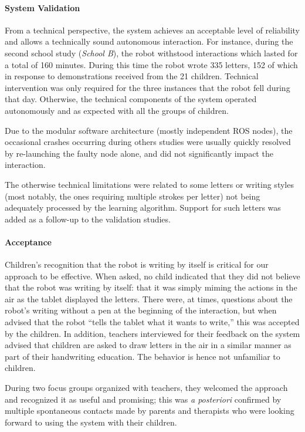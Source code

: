 \documentclass{article}
\begin{document}
\paragraph{System Validation}

From a technical perspective, the system achieves an acceptable level of
reliability and allows a technically sound autonomous interaction. For instance,
during the second school study (\textit{School B}), the robot withstood
interactions which lasted for a total of 160 minutes.  During this time the
robot wrote 335 letters, 152 of which in response to demonstrations received
from the 21 children. Technical intervention was only required for the three
instances that the robot fell during that day.  Otherwise, the technical
components of the system operated autonomously and as expected with all the
groups of children.

Due to the modular software architecture (mostly independent ROS nodes), the
occasional crashes occurring during others studies were usually quickly resolved
by re-launching the faulty node alone, and did not significantly impact the
interaction.

The otherwise technical limitations were related to some letters or writing
styles (most notably, the ones requiring multiple strokes per letter) not being
adequately processed by the learning algorithm. Support for such letters was
added as a follow-up to the validation studies.

\paragraph{Acceptance}

Children's recognition that the robot is writing by itself is critical for our
approach to be effective. When asked, no child indicated that they did not
believe that the robot was writing by itself: that it was simply miming the 
actions in the air as the tablet displayed the letters. There were, at times, questions
about the robot's writing without a pen at the beginning of the interaction, but when
advised that the robot ``tells the tablet what it wants to write,'' this was
accepted by the children.  In addition, teachers interviewed for their feedback on
the system advised that children are asked to draw letters in the air in a
similar manner as part of their handwriting education. The behavior is hence
not unfamiliar to children.

During two focus groups organized with teachers, they welcomed the approach and
recognized it as useful and promising; this was \textit{a posteriori} confirmed
by multiple spontaneous contacts made by parents and therapists who were looking
forward to using the system with their children.
\end{document}
